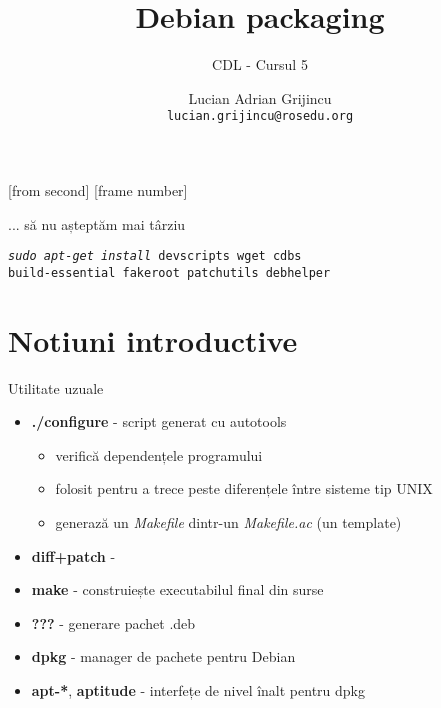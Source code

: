 \documentclass{beamer}
\title[Debian packaging]{Debian packaging}
\subtitle{CDL - Cursul 5}
\institute{ROSEdu}
\author{Lucian Adrian Grijincu \\ \texttt{lucian.grijincu@rosedu.org}}
\begin{document}
[from second]
[frame number]

\frame{\titlepage}

\frame{\tableofcontents}

\begin{frame}{... să nu așteptăm mai târziu}
  \begin{beamerboxesrounded}[lower=block body,shadow=true]{}
    \large {\texttt{\textit{sudo apt-get install} devscripts wget cdbs \\
      build-essential fakeroot patchutils debhelper}}
  \end{beamerboxesrounded}
\end{frame}


\section{Notiuni introductive}

\frame{\tableofcontents[currentsection]}


\begin{frame}{Utilitate uzuale}
  \begin{itemize}[<+->]
  \item \textbf{./configure} - script generat cu autotools
    \begin{itemize}
    \item verifică dependențele programului
    \item folosit pentru a trece peste diferențele între sisteme tip UNIX
    \item generază un \textit{Makefile} dintr-un \textit{Makefile.ac} (un template)
    \end{itemize}
  \item \textbf{diff+patch} - 
  \item \textbf{make} - construiește executabilul final din surse
  \item \textbf{???} - generare pachet .deb
  \item \textbf{dpkg} - manager de pachete pentru Debian
  \item \textbf{apt-*}, \textbf{aptitude} - interfețe de nivel înalt pentru dpkg
  \end{itemize}
\end{frame}
\end{document}
